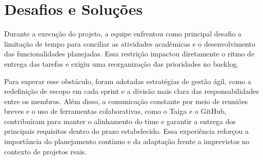 \section{Desafios e Soluções}

Durante a execução do projeto, a equipe enfrentou como principal desafio a limitação de tempo para conciliar as atividades acadêmicas e o desenvolvimento das funcionalidades planejadas. Essa restrição impactou diretamente o ritmo de entrega das tarefas e exigiu uma reorganização das prioridades no backlog. 

Para superar esse obstáculo, foram adotadas estratégias de gestão ágil, como a redefinição de escopo em cada sprint e a divisão mais clara das responsabilidades entre os membros. Além disso, a comunicação constante por meio de reuniões breves e o uso de ferramentas colaborativas, como o Taiga e o GitHub, contribuíram para manter o alinhamento do time e garantir a entrega dos principais requisitos dentro do prazo estabelecido. Essa experiência reforçou a importância do planejamento contínuo e da adaptação frente a imprevistos no contexto de projetos reais.
